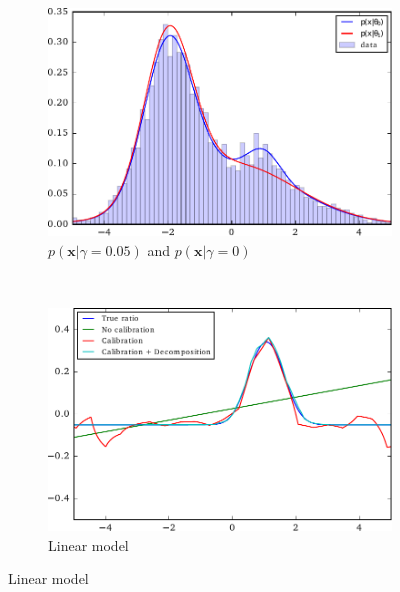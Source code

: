 \documentclass[12pt]{article}
\numberwithin{equation}{section}
\theoremstyle{plain}
\begin{document}
\begin{figure}
    \centering
    \begin{subfigure}[b]{0.45\textwidth}
        \includegraphics[width=\textwidth]{figures/fig1a.pdf}
        \caption{$p(\mathbf{x}|\gamma=0.05)$ and $p(\mathbf{x}|\gamma=0)$}
        \label{fig:1a}
    \end{subfigure}
    ~ %
    \begin{subfigure}[b]{0.45\textwidth}
        \includegraphics[width=\textwidth]{figures/fig1b.pdf}
        \caption{Linear model}
        \label{fig:1b}
    \end{subfigure}

    \vspace{1em}


\end{figure}
\end{document}
